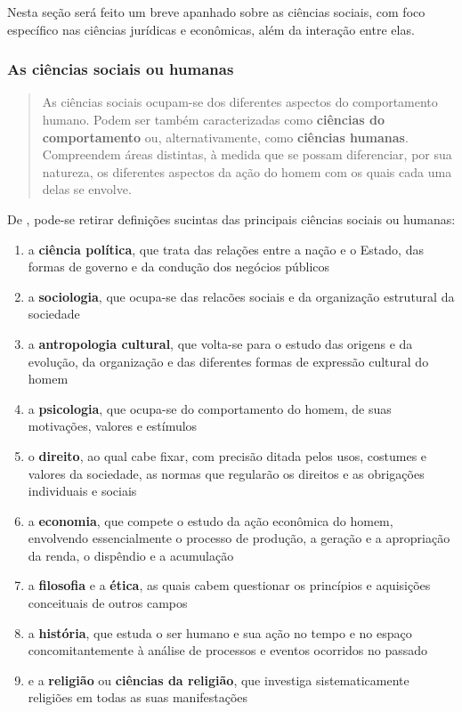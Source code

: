 \documentclass[]{article}
\providecommand{\tightlist}{%
  \setlength{\itemsep}{0pt}\setlength{\parskip}{0pt}}
\begin{document}
Nesta seção será feito um breve apanhado sobre as ciências sociais, com
foco específico nas ciências jurídicas e econômicas, além da interação
entre elas.

\subsubsection{As ciências sociais ou
humanas}\label{as-ciencias-sociais-ou-humanas}

\begin{quote}
As ciências sociais ocupam-se dos diferentes aspectos do comportamento
humano. Podem ser também caracterizadas como \textbf{ciências do
comportamento} ou, alternativamente, como \textbf{ciências humanas}.
Compreendem áreas distintas, à medida que se possam diferenciar, por sua
natureza, os diferentes aspectos da ação do homem com os quais cada uma
delas se envolve. \cite[p.~30]{rossetti}
\end{quote}

De , pode-se retirar definições sucintas
das principais ciências sociais ou humanas:

\begin{enumerate}
\def\labelenumi{\arabic{enumi}.}
\tightlist
\item
  a \textbf{ciência política}, que trata das relações entre a nação e o
  Estado, das formas de governo e da condução dos negócios públicos
  \cite[p.~30]{rossetti}
\item
  a \textbf{sociologia}, que ocupa-se das relacões sociais e da
  organização estrutural da sociedade \cite[p.~30-31]{rossetti}
\item
  a \textbf{antropologia cultural}, que volta-se para o estudo das
  origens e da evolução, da organização e das diferentes formas de
  expressão cultural do homem \cite[p.~31]{rossetti}
\item
  a \textbf{psicologia}, que ocupa-se do comportamento do homem, de suas
  motivações, valores e estímulos \cite[p.~31]{rossetti}
\item
  o \textbf{direito}, ao qual cabe fixar, com precisão ditada pelos
  usos, costumes e valores da sociedade, as normas que regularão os
  direitos e as obrigações individuais e sociais \cite[p.~31]{rossetti}
\item
  a \textbf{economia}, que compete o estudo da ação econômica do homem,
  envolvendo essencialmente o processo de produção, a geração e a
  apropriação da renda, o dispêndio e a acumulação
  \cite[p.~31]{rossetti}
\item
  a \textbf{filosofia} e a \textbf{ética}, as quais cabem questionar os
  princípios e aquisições conceituais de outros campos
  \cite[p.~31]{rossetti}
\item
  a \textbf{história}, que estuda o ser humano e sua ação no tempo e no
  espaço concomitantemente à análise de processos e eventos ocorridos no
  passado \cite{historia}
\item
  e a \textbf{religião} ou \textbf{ciências da religião}, que investiga
  sistematicamente religiões em todas as suas manifestações
  \cite{religiao}
\end{enumerate}
\end{document}
